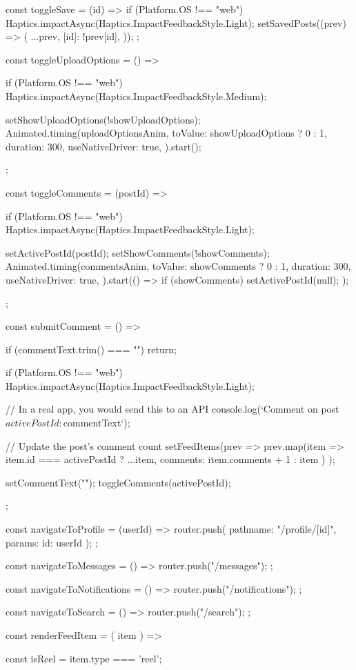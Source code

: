 {  const toggleSave = (id) => {
    if (Platform.OS !== "web") {
      Haptics.impactAsync(Haptics.ImpactFeedbackStyle.Light);
    }
    setSavedPosts((prev) => ({
      ...prev,
      [id]: !prev[id],
    }));
  };
  
  const toggleUploadOptions = () => {
    if (Platform.OS !== "web") {
      Haptics.impactAsync(Haptics.ImpactFeedbackStyle.Medium);
    }
    
    setShowUploadOptions(!showUploadOptions);
    Animated.timing(uploadOptionsAnim, {
      toValue: showUploadOptions ? 0 : 1,
      duration: 300,
      useNativeDriver: true,
    }).start();
  };
  
  const toggleComments = (postId) => {
    if (Platform.OS !== "web") {
      Haptics.impactAsync(Haptics.ImpactFeedbackStyle.Light);
    }
    
    setActivePostId(postId);
    setShowComments(!showComments);
    Animated.timing(commentsAnim, {
      toValue: showComments ? 0 : 1,
      duration: 300,
      useNativeDriver: true,
    }).start(() => {
      if (showComments) {
        setActivePostId(null);
      }
    });
  };
  
  const submitComment = () => {
    if (commentText.trim() === "") return;
    
    if (Platform.OS !== "web") {
      Haptics.impactAsync(Haptics.ImpactFeedbackStyle.Light);
    }
    
    // In a real app, you would send this to an API
    console.log(`Comment on post ${activePostId}: ${commentText}`);
    
    // Update the post's comment count
    setFeedItems(prev => 
      prev.map(item => 
        item.id === activePostId 
          ? { ...item, comments: item.comments + 1 } 
          : item
      )
    );
    
    setCommentText("");
    toggleComments(activePostId);
  };
  
  const navigateToProfile = (userId) => {
    router.push({
      pathname: "/profile/[id]",
      params: { id: userId }
    });
  };

  const navigateToMessages = () => {
    router.push("/messages");
  };

  const navigateToNotifications = () => {
    router.push("/notifications");
  };
  
  const navigateToSearch = () => {
    router.push("/search");
  };
  
  const renderFeedItem = ({ item }) => {
    const isReel = item.type === 'reel';
    
}}
